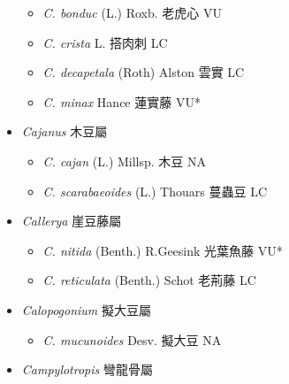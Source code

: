 \begin{itemize}
  \begin{itemize}
        \item[] \textit{C. bonduc} (L.) Roxb.  老虎心   VU
        \item[] \textit{C. crista} L.  搭肉刺   LC
        \item[] \textit{C. decapetala} (Roth) Alston  雲實   LC
        \item[] \textit{C. minax} Hance  蓮實藤   VU*
  \end{itemize}
 \item[] \textit{Cajanus} 木豆屬
                                
  \begin{itemize}
        \item[] \textit{C. cajan} (L.) Millsp.  木豆   NA
        \item[] \textit{C. scarabaeoides} (L.) Thouars  蔓蟲豆   LC
  \end{itemize}
 \item[] \textit{Callerya} 崖豆藤屬
                                
  \begin{itemize}
        \item[] \textit{C. nitida} (Benth.) R.Geesink  光葉魚藤   VU*
        \item[] \textit{C. reticulata} (Benth.) Schot  老荊藤   LC
  \end{itemize}
 \item[] \textit{Calopogonium} 擬大豆屬
                                
  \begin{itemize}
        \item[] \textit{C. mucunoides} Desv.  擬大豆   NA
  \end{itemize}
 \item[] \textit{Campylotropis} 彎龍骨屬
                                

\end{itemize}
